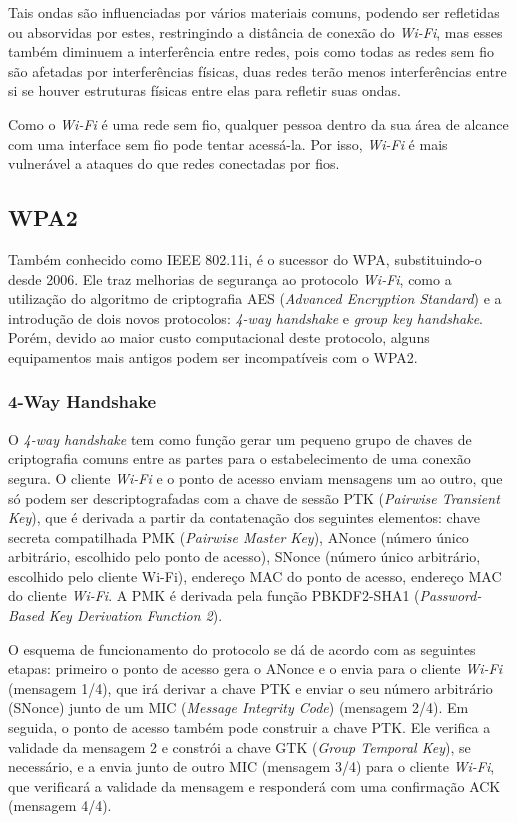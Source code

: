 \documentclass[12pt]{article}
\begin{document}
Tais ondas são influenciadas por vários materiais comuns, podendo ser refletidas ou absorvidas por estes, restringindo a distância de conexão do \textit{Wi-Fi}, mas esses também diminuem a interferência entre redes, pois como todas as redes sem fio são afetadas por interferências físicas, duas redes terão menos interferências entre si se houver estruturas físicas entre elas para refletir suas ondas.

Como o \textit{Wi-Fi} é uma rede sem fio, qualquer pessoa dentro da sua área de alcance com uma interface sem fio pode tentar acessá-la. Por isso, \textit{Wi-Fi} é mais vulnerável a ataques do que redes conectadas por fios.

\subsection{WPA2}
Também conhecido como IEEE 802.11i, é o sucessor do WPA, substituindo-o desde 2006. Ele traz melhorias de segurança ao protocolo \textit{Wi-Fi}, como a utilização do algoritmo de criptografia AES (\textit{Advanced Encryption Standard}) e a introdução de dois novos protocolos: \textit{4-way handshake} e \textit{group key handshake}. Porém, devido ao maior custo computacional deste protocolo, alguns equipamentos mais antigos podem ser incompatíveis com o WPA2.

\subsubsection{4-Way Handshake}
O \textit{4-way handshake} tem como função gerar um pequeno grupo de chaves de criptografia comuns entre as partes para o estabelecimento de uma conexão segura. O cliente \textit{Wi-Fi} e o ponto de acesso enviam mensagens um ao outro, que só podem ser descriptografadas com a chave de sessão PTK (\textit{Pairwise Transient Key}), que é derivada a partir da contatenação dos seguintes elementos: chave secreta compatilhada PMK (\textit{Pairwise Master Key}), ANonce (número único arbitrário, escolhido pelo ponto de acesso), SNonce (número único arbitrário, escolhido pelo cliente Wi-Fi), endereço MAC do ponto de acesso, endereço MAC do cliente \textit{Wi-Fi}. A PMK é derivada pela função PBKDF2-SHA1 (\textit{Password-Based Key Derivation Function 2}).

O esquema de funcionamento do protocolo se dá de acordo com as seguintes etapas: primeiro o ponto de acesso gera o ANonce e o envia para o cliente \textit{Wi-Fi} (mensagem 1/4), que irá derivar a chave PTK e enviar o seu número arbitrário (SNonce) junto de um MIC (\textit{Message Integrity Code}) (mensagem 2/4). Em seguida, o ponto de acesso também pode construir a chave PTK. Ele verifica a validade da mensagem 2 e constrói a chave GTK (\textit{Group Temporal Key}), se necessário, e a envia junto de outro MIC (mensagem 3/4) para o cliente \textit{Wi-Fi}, que verificará a validade da mensagem e responderá com uma confirmação ACK (mensagem 4/4).
\end{document}
